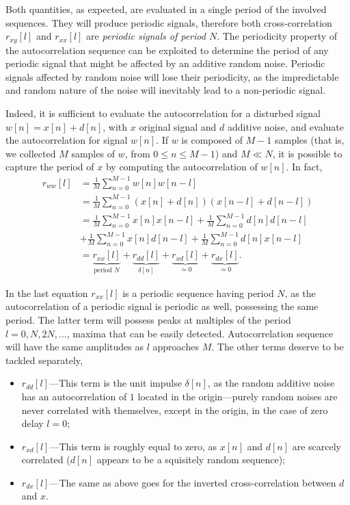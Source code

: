 \documentclass[\documentfontsize, twocolumn]{\classname}
\begin{document}
Both quantities, as expected, are evaluated in a single period of the involved sequences. They will produce periodic signals, therefore both cross-correlation $r_{xy}[l]$ and $r_{xx}[l]$ are \emph{periodic signals of period $N$}. The periodicity property of the autocorrelation sequence can be exploited to determine the period of any periodic signal that might be affected by an additive random noise. Periodic signals affected by random noise will lose their periodicity, as the impredictable and random nature of the noise will inevitably lead to a non-periodic signal.

Indeed, it is sufficient to evaluate the autocorrelation for a disturbed signal $w[n] = x[n] + d[n]$, with $x$ original signal and $d$ additive noise, and evaluate the autocorrelation for signal $w[n]$. If $w$ is composed of $M-1$ samples (that is, we collected $M$ samples of $w$, from $0 \leq n \leq M-1$) and $M \ll N$, it is possible to capture the period of $x$ by computing the autocorrelation of $w[n]$. In fact,
\begin{align*}
    r_{ww}[l] &= \frac 1 M \sum_{n=0}^{M-1} w[n]w[n-l]\\
              &= \frac 1 M \sum_{n=0}^{M-1} (x[n] + d[n])(x[n-l] + d[n-l])\\
              &= \frac 1 M \sum_{n=0}^{M-1} x[n] x[n-l] + \frac 1 M \sum_{n=0}^{M-1} d[n]d[n-l] \\ &+ \frac 1 M \sum_{n=0}^{M-1} x[n]d[n-l] + \frac 1 M \sum_{n=0}^{M-1} d[n]x[n-l]\\
              &= \underbrace{r_{xx}[l]}_{\mbox{period } N} + \underbrace{r_{dd}[l]}_{\delta[n]} + \underbrace{r_{xd}[l]}_{\simeq 0} + \underbrace{r_{dx}[l]}_{\simeq 0}.
\end{align*}

In the last equation $r_{xx}[l]$ is a periodic sequence having period $N$, as the autocorrelation of a periodic signal is periodic as well, possessing the same period. The latter term will possess peaks at multiples of the period $l=0, N, 2N,\dots$, maxima that can be easily detected. Autocorrelation sequence will have the same amplitudes as $l$ approaches $M$. The other terms deserve to be tackled separately,
\begin{itemize}
    \item $r_{dd}[l]$---This term is the unit impulse $\delta[n]$, as the random additive noise has an autocorrelation of $1$ located in the origin---purely random noises are never correlated with themselves, except in the origin, in the case of zero delay $l=0$;
    \item $r_{xd}[l]$---This term is roughly equal to zero, as $x[n]$ and $d[n]$ are scarcely correlated ($d[n]$ appears to be a squi\-si\-te\-ly random sequence);
    \item $r_{dx}[l]$---The same as above goes for the inverted cross-correlation between $d$ and $x$.
\end{itemize}
\end{document}
